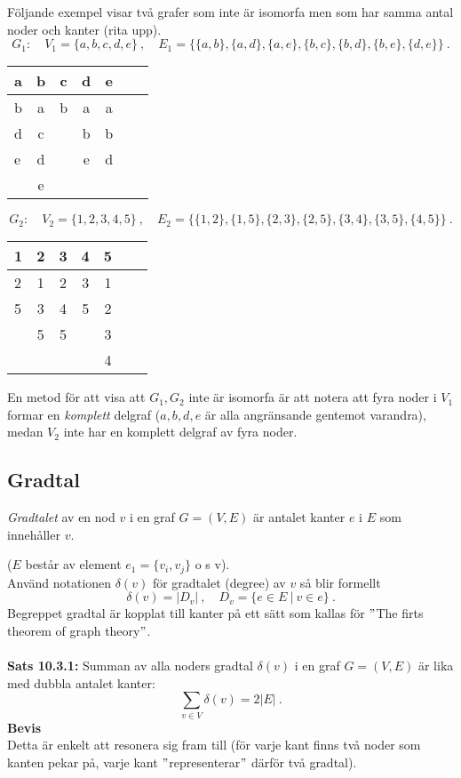 \documentclass{article}
\begin{document}
Följande exempel visar två grafer som inte är isomorfa men som har samma antal noder och kanter (rita upp).
$$
G_1: \quad V_1=\{a,b,c,d,e\} \ , \quad E_1=\big\{\{a,b\},\{a,d\},\{a,e\},\{b,c\},\{b,d\},\{b,e\},\{d,e\}\big\} \ .
$$
\begin{center}
\begin{tabular}{l*{5}{c}r}
a & b & c & d & e\\
\hline
b & a & b & a & a \\
d & c & & b & b\\
e & d & & e & d\\
& e
\end{tabular}
\end{center}
$$
G_2: \quad V_2=\{1,2,3,4,5\} \ , \quad E_2=\big\{\{1,2\},\{1,5\},\{2,3\},\{2,5\},\{3,4\},\{3,5\},\{4,5\}\big\} \ .
$$
\begin{center}
\begin{tabular}{l*{5}{c}r}
1 & 2 & 3 & 4 & 5\\
\hline
2 & 1 & 2 & 3 & 1\\
5 & 3 & 4 & 5 & 2\\
 & 5 & 5 & & 3\\
 & & & & 4
\end{tabular}
\end{center}
En metod för att visa att $G_1,G_2$ inte är isomorfa är att notera att fyra noder i $V_1$ formar en \textit{komplett} delgraf ($a,b,d,e$ är alla angränsande gentemot varandra), medan $V_2$ inte har en komplett delgraf av fyra noder.

\subsection{Gradtal}
\textit{Gradtalet} av en nod $v$ i en graf $G=(V,E)$ är antalet kanter $e$ i $E$ som innehåller $v$.

($E$ består av element $e_1=\{v_i,v_j\}$ o s v).\\
Använd notationen $\delta(v)$ för gradtalet (degree) av $v$ så blir formellt
$$
\delta(v)=|D_v| \ , \quad D_v=\{e\in E \ | \ v\in e\} \ .
$$
Begreppet gradtal är kopplat till kanter på ett sätt som kallas för $"$The firts theorem of graph theory$"$.\\ \\
\textbf{Sats 10.3.1:} Summan av alla noders gradtal $\delta(v)$ i en graf $G=(V,E)$ är lika med dubbla antalet kanter:
$$
\sum_{v\in V}\delta(v)=2|E| \ .
$$
\textbf{Bevis}\\
Detta är enkelt att resonera sig fram till (för varje kant finns två noder som kanten pekar på, varje kant $"$representerar$"$ därför två gradtal). 
\end{document}
